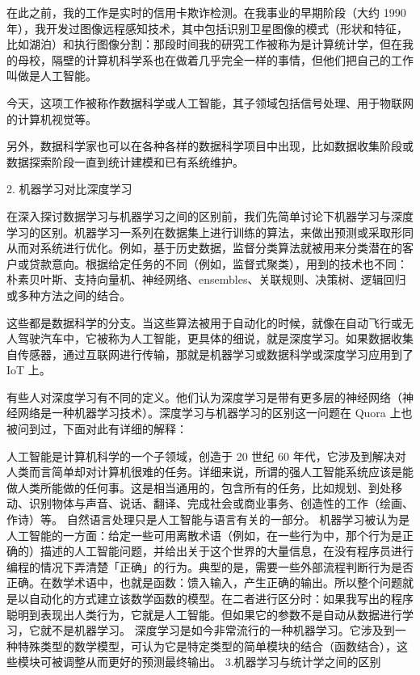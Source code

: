 \documentclass[10pt,a4paper]{ctexbook}
\begin{document}
在此之前，我的工作是实时的信用卡欺诈检测。在我事业的早期阶段（大约 1990 年），我开发过图像远程感知技术，其中包括识别卫星图像的模式（形状和特征，比如湖泊）和执行图像分割：那段时间我的研究工作被称为是计算统计学，但在我的母校，隔壁的计算机科学系也在做着几乎完全一样的事情，但他们把自己的工作叫做是人工智能。

今天，这项工作被称作数据科学或人工智能，其子领域包括信号处理、用于物联网的计算机视觉等。

另外，数据科学家也可以在各种各样的数据科学项目中出现，比如数据收集阶段或数据探索阶段一直到统计建模和已有系统维护。

2. 机器学习对比深度学习

在深入探讨数据学习与机器学习之间的区别前，我们先简单讨论下机器学习与深度学习的区别。机器学习一系列在数据集上进行训练的算法，来做出预测或采取形同从而对系统进行优化。例如，基于历史数据，监督分类算法就被用来分类潜在的客户或贷款意向。根据给定任务的不同（例如，监督式聚类），用到的技术也不同：朴素贝叶斯、支持向量机、神经网络、ensembles、关联规则、决策树、逻辑回归或多种方法之间的结合。

这些都是数据科学的分支。当这些算法被用于自动化的时候，就像在自动飞行或无人驾驶汽车中，它被称为人工智能，更具体的细说，就是深度学习。如果数据收集自传感器，通过互联网进行传输，那就是机器学习或数据科学或深度学习应用到了 IoT 上。

有些人对深度学习有不同的定义。他们认为深度学习是带有更多层的神经网络（神经网络是一种机器学习技术）。深度学习与机器学习的区别这一问题在 Quora 上也被问到过，下面对此有详细的解释：

人工智能是计算机科学的一个子领域，创造于 20 世纪 60 年代，它涉及到解决对人类而言简单却对计算机很难的任务。详细来说，所谓的强人工智能系统应该是能做人类所能做的任何事。这是相当通用的，包含所有的任务，比如规划、到处移动、识别物体与声音、说话、翻译、完成社会或商业事务、创造性的工作（绘画、作诗）等。
自然语言处理只是人工智能与语言有关的一部分。
机器学习被认为是人工智能的一方面：给定一些可用离散术语（例如，在一些行为中，那个行为是正确的）描述的人工智能问题，并给出关于这个世界的大量信息，在没有程序员进行编程的情况下弄清楚「正确」的行为。典型的是，需要一些外部流程判断行为是否正确。在数学术语中，也就是函数：馈入输入，产生正确的输出。所以整个问题就是以自动化的方式建立该数学函数的模型。在二者进行区分时：如果我写出的程序聪明到表现出人类行为，它就是人工智能。但如果它的参数不是自动从数据进行学习，它就不是机器学习。
深度学习是如今非常流行的一种机器学习。它涉及到一种特殊类型的数学模型，可认为它是特定类型的简单模块的结合（函数结合），这些模块可被调整从而更好的预测最终输出。
3.机器学习与统计学之间的区别
\end{document}
